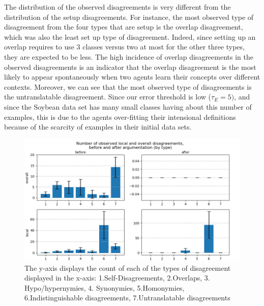 The distribution of the observed disagreements is very different from the distribution of the setup disagreements. For instance, the most observed type of disagreement from the four types that are setup is the overlap disagreement, which was also the least set up type of disagreement. Indeed, since setting up an overlap requires to use 3 classes versus two at most for the other three types, they are expected to be less. The high incidence of overlap disagreements in the observed disagreements is an indicator that the overlap disagreement is the most likely to appear spontaneously when two agents learn their concepts over different contexts. Moreover, we can see that the most observed type of disagreements is the untranslatable disagreement. Since our error threshold is low ($\tau_{E} = 5)$, and since the Soybean data set has many small classes having about this number of examples, this is due to the agents over-fitting their intensional definitions because of the scarcity of examples in their initial data sets.


\begin{figure}
        \centering
        \includegraphics[width=\textwidth]{results/Figure_2_resized.png}
        \caption{The y-axis displays the count of each of the types of disagreement displayed in the x-axis: 1.Self-Disagreements, 2.Overlaps, 3. Hypo/hypernymies, 4. Synonymies, 5.Homonymies, 6.Indistinguishable disagreements, 7.Untranslatable disagreements}
        \label{fig:gen_local}
\end{figure}

